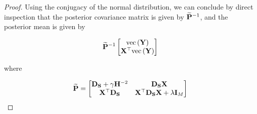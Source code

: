 \begin{proof}
    Using the conjugacy of the normal distribution, we can conclude by direct inspection that the posterior covariance matrix is given by $\widetilde{\mathbf{P}}^{-1}$, and the posterior mean is given by 

    $$
    \widetilde{\mathbf{P}}^{-1} \begin{bmatrix} \text{\textup{vec}}\left(\mathbf{Y}\right) \\ \mathbf{X}^\top \text{\textup{vec}}\left(\mathbf{Y}\right) \end{bmatrix}
    $$

    where 

    $$
    \widetilde{\mathbf{P}} = \begin{bmatrix}
        \mathbf{D}_{\mathbf{S}} + \gamma \mathbf{H}^{-2} & \mathbf{D}_{\mathbf{S}}  \mathbf{X} \\
        \mathbf{X}^\top \mathbf{D}_{\mathbf{S}} & \mathbf{X}^\top \mathbf{D}_{\mathbf{S}} \mathbf{X} + \lambda \mathbf{I}_M   
       \end{bmatrix}
    $$

\end{proof}